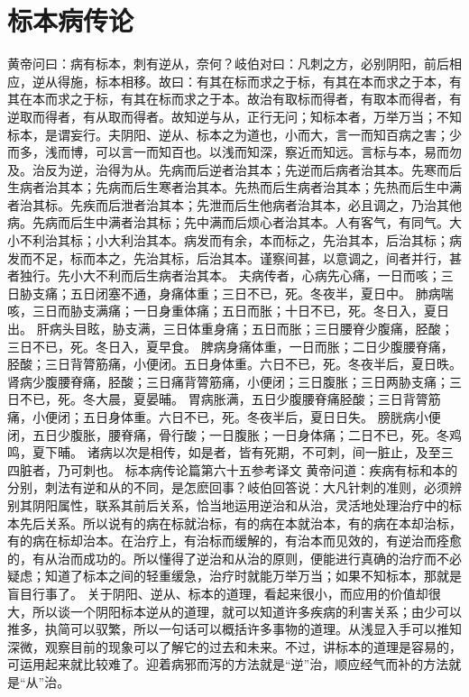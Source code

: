 \documentclass[a4paper,12pt,UTF8,twoside]{ctexbook}
\begin{document}
\chapter{标本病传论}
黄帝问曰：病有标本，刺有逆从，奈何？岐伯对曰：凡刺之方，必别阴阳，前后相应，逆从得施，标本相移。故曰：有其在标而求之于标，有其在本而求之于本，有其在本而求之于标，有其在标而求之于本。故治有取标而得者，有取本而得者，有逆取而得者，有从取而得者。故知逆与从，正行无问；知标本者，万举万当；不知标本，是谓妄行。夫阴阳、逆从、标本之为道也，小而大，言一而知百病之害；少而多，浅而博，可以言一而知百也。以浅而知深，察近而知远。言标与本，易而勿及。治反为逆，治得为从。先病而后逆者治其本；先逆而后病者治其本。先寒而后生病者治其本；先病而后生寒者治其本。先热而后生病者治其本；先热而后生中满者治其标。先疾而后泄者治其本；先泄而后生他病者治其本，必且调之，乃治其他病。先病而后生中满者治其标；先中满而后烦心者治其本。人有客气，有同气。大小不利治其标；小大利治其本。病发而有余，本而标之，先治其本，后治其标；病发而不足，标而本之，先治其标，后治其本。谨察间甚，以意调之，间者并行，甚者独行。先小大不利而后生病者治其本。
夫病传者，心病先心痛，一日而咳；三日胁支痛；五日闭塞不通，身痛体重；三日不已，死。冬夜半，夏日中。
肺病喘咳，三日而胁支满痛；一日身重体痛；五日而胀；十日不已，死。冬日入，夏日出。
肝病头目眩，胁支满，三日体重身痛；五日而胀；三日腰脊少腹痛，胫酸；三日不已，死。冬日入，夏早食。
脾病身痛体重，一日而胀；二日少腹腰脊痛，胫酸；三日背膂筋痛，小便闭。五日身体重。六日不已，死。冬夜半后，夏日昳。
肾病少腹腰脊痛，胫酸；三日痛背膂筋痛，小便闭；三日腹胀；三日两胁支痛；三日不已，死。冬大晨，夏晏晡。
胃病胀满，五日少腹腰脊痛胫酸；三日背膂筋痛，小便闭；五日身体重。六日不已，死。冬夜半后，夏日日失。
膀胱病小便闭，五日少腹胀，腰脊痛，骨行酸；一日腹胀；一日身体痛；二日不已，死。冬鸡鸣，夏下晡。
诸病以次是相传，如是者，皆有死期，不可刺，间一脏止，及至三四脏者，乃可刺也。
标本病传论篇第六十五参考译文
黄帝问道：疾病有标和本的分别，刺法有逆和从的不同，是怎麽回事？岐伯回答说：大凡针刺的准则，必须辨别其阴阳属性，联系其前后关系，恰当地运用逆治和从治，灵活地处理治疗中的标本先后关系。所以说有的病在标就治标，有的病在本就治本，有的病在本却治标，有的病在标却治本。在治疗上，有治标而缓解的，有治本而见效的，有逆治而痊愈的，有从治而成功的。所以懂得了逆治和从治的原则，便能进行真确的治疗而不必疑虑；知道了标本之间的轻重缓急，治疗时就能万举万当；如果不知标本，那就是盲目行事了。
关于阴阳、逆从、标本的道理，看起来很小，而应用的价值却很大，所以谈一个阴阳标本逆从的道理，就可以知道许多疾病的利害关系；由少可以推多，执简可以驭繁，所以一句话可以概括许多事物的道理。从浅显入手可以推知深微，观察目前的现象可以了解它的过去和未来。不过，讲标本的道理是容易的，可运用起来就比较难了。迎着病邪而泻的方法就是“逆”治，顺应经气而补的方法就是“从”治。
\end{document}
